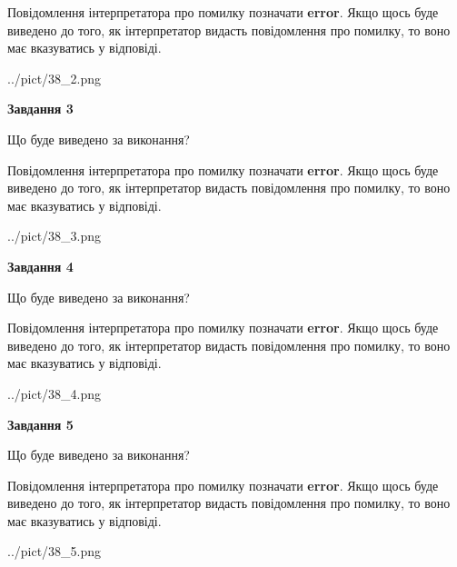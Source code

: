 \documentclass[12pt, ukrainian]{article}
\begin{document}
{\begin {large}
Повідомлення інтерпретатора про помилку позначати \textbf{error}.
Якщо щось буде виведено до того, як інтерпретатор видасть повідомлення про помилку, 
то воно має вказуватись у відповіді. \par


\begin{center}
	{../pict/38_2.png}
\end{center}
\newpage

{\begin {center}\textbf{Завдання 3}\end {center}}\par
Що буде виведено за виконання?

Повідомлення інтерпретатора про помилку позначати \textbf{error}.
Якщо щось буде виведено до того, як інтерпретатор видасть повідомлення про помилку, 
то воно має вказуватись у відповіді. \par


\begin{center}
	{../pict/38_3.png}
\end{center}
\newpage

{\begin {center}\textbf{Завдання 4}\end {center}}\par
Що буде виведено за виконання?

Повідомлення інтерпретатора про помилку позначати \textbf{error}.
Якщо щось буде виведено до того, як інтерпретатор видасть повідомлення про помилку, 
то воно має вказуватись у відповіді. \par


\begin{center}
	{../pict/38_4.png}
\end{center}
\newpage

{\begin {center}\textbf{Завдання 5}\end {center}}\par
Що буде виведено за виконання?

Повідомлення інтерпретатора про помилку позначати \textbf{error}.
Якщо щось буде виведено до того, як інтерпретатор видасть повідомлення про помилку, 
то воно має вказуватись у відповіді. \par


\begin{center}
	{../pict/38_5.png}
\end{center}
\newpage


\end{large}}
\end{document}
